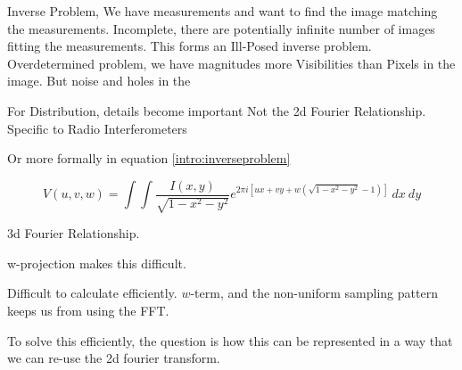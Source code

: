 Inverse Problem, We have measurements and want to find the image matching the measurements. Incomplete, there are potentially infinite number of images fitting 
the measurements. This forms an Ill-Posed inverse problem. 
Overdetermined problem, we have magnitudes more Visibilities than Pixels in the image. But noise and holes in the 

For Distribution, details become important
Not the 2d Fourier Relationship.
Specific to Radio Interferometers


Or more formally in equation \eqref{intro:inverseproblem}


\begin{equation}\label{intro:inverseproblem}
V(u, v, w) = \int\int \frac{I(x, y)}{\sqrt{1 - x^2 - y ^2}} e^{2 \pi i [ux+vy+ w(\sqrt{1 - x^2 - y ^2} - 1)]} \: dx \: dy
\end{equation}

3d Fourier Relationship.

w-projection makes this difficult.

Difficult to calculate efficiently. $w$-term, and the non-uniform sampling pattern keeps us from using the FFT.

To solve this efficiently, the question is how this can be represented in a way that we can re-use the 2d fourier transform.


